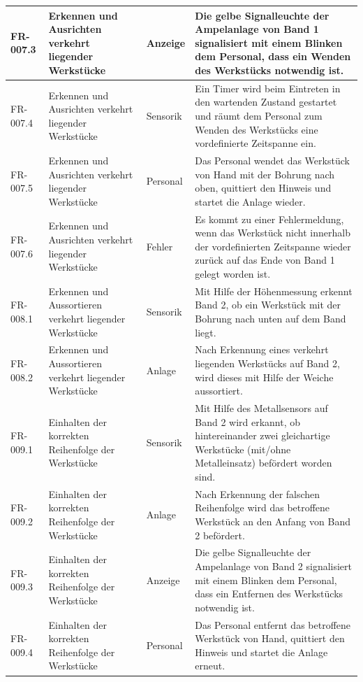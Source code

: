 \documentclass[oneside,a4paper,titlepage]{scrartcl} %
\begin{document}
\begin{small}
\begin{longtable}{|C{2cm}|L{4cm}|C{1.5cm}|L{5.5cm}|}
  \hline
  FR-007.3 & Erkennen und Ausrichten verkehrt liegender Werkstücke & Anzeige & Die gelbe Signalleuchte der Ampelanlage von Band 1 signalisiert mit einem Blinken dem Personal, dass ein Wenden des Werkstücks notwendig ist.\\
  \hline
  FR-007.4 & Erkennen und Ausrichten verkehrt liegender Werkstücke & Sensorik & Ein Timer wird beim Eintreten in den wartenden Zustand gestartet und räumt dem Personal zum Wenden des Werkstücks eine vordefinierte Zeitspanne ein.\\
  \hline
  FR-007.5 & Erkennen und Ausrichten verkehrt liegender Werkstücke & Personal & Das Personal wendet das Werkstück von Hand mit der Bohrung nach oben, quittiert den Hinweis und startet die Anlage wieder.\\
  \hline
  FR-007.6 & Erkennen und Ausrichten verkehrt liegender Werkstücke & Fehler & Es kommt zu einer Fehlermeldung, wenn das Werkstück nicht innerhalb der vordefinierten Zeitspanne wieder zurück auf das Ende von Band 1 gelegt worden ist.\\
  \hline
   FR-008.1 & Erkennen und Aussortieren verkehrt liegender Werkstücke & Sensorik & Mit Hilfe der Höhenmessung erkennt Band 2, ob ein Werkstück mit der Bohrung nach unten auf dem Band liegt.\\
  \hline
   FR-008.2 & Erkennen und Aussortieren verkehrt liegender Werkstücke & Anlage & Nach Erkennung eines verkehrt liegenden Werkstücks auf Band 2, wird dieses mit Hilfe der Weiche aussortiert.\\
  \hline
  FR-009.1 & Einhalten der korrekten Reihenfolge der Werkstücke & Sensorik & Mit Hilfe des Metallsensors auf Band 2 wird erkannt, ob hintereinander zwei gleichartige Werkstücke (mit/ohne Metalleinsatz) befördert worden sind.\\
  \hline
  FR-009.2 & Einhalten der korrekten Reihenfolge der Werkstücke & Anlage & Nach Erkennung der falschen Reihenfolge wird das betroffene Werkstück an den Anfang von Band 2 befördert.\\
  \hline
  FR-009.3 & Einhalten der korrekten Reihenfolge der Werkstücke & Anzeige & Die gelbe Signalleuchte der Ampelanlage von Band 2 signalisiert mit einem Blinken dem Personal, dass ein Entfernen des Werkstücks notwendig ist.\\
  \hline
  FR-009.4 & Einhalten der korrekten Reihenfolge der Werkstücke & Personal & Das Personal entfernt das betroffene Werkstück von Hand, quittiert den Hinweis und startet die Anlage erneut.\\

\end{longtable}
\end{small}
\end{document}
